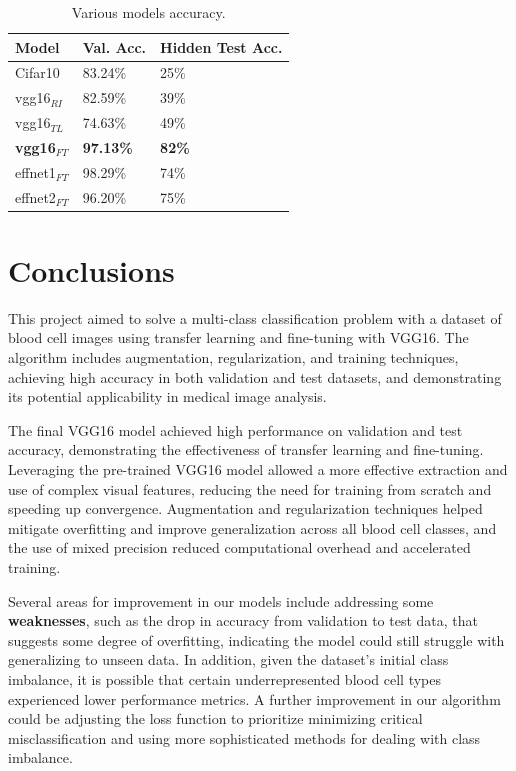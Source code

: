 \documentclass[11pt]{article}
\begin{document}
\begin{multicols*}{2}
        \begin{table}[H]
            \centering
            \setlength{\tabcolsep}{3pt}
            \caption{Various models accuracy.}
            \begin{tabularx}{\linewidth}{lYY}
                \toprule
                Model & Val. Acc. & Hidden Test Acc. \\
                \midrule
                Cifar10 & 83.24\% & 25\% \\
                vgg16$_{RI}$ & 82.59\% & 39\%\\
                vgg16$_{TL}$ & 74.63\% & 49\% \\
                \textbf{vgg16$_{FT}$} & \textbf{97.13\%} & \textbf{82\%} \\
                effnet1$_{FT}$ & 98.29\% & 74\% \\
                effnet2$_{FT}$ & 96.20\% & 75\% \\
                \bottomrule
            \end{tabularx}
            \label{tb:Measurements}
        \end{table}

        \section{Conclusions}

        This project aimed to solve a multi-class classification problem with a dataset of blood cell images using transfer learning and fine-tuning with VGG16. The algorithm includes augmentation, regularization, and training techniques, achieving high accuracy in both validation and test datasets, and demonstrating its potential applicability in medical image analysis.

        
        The final VGG16 model achieved high performance on validation and test accuracy, demonstrating the effectiveness of transfer learning and fine-tuning. Leveraging the pre-trained VGG16 model allowed a more effective extraction and use of complex visual features, reducing the need for training from scratch and speeding up convergence. Augmentation and regularization techniques helped mitigate overfitting and improve generalization across all blood cell classes, and the use of mixed precision reduced computational overhead and accelerated training. 
        
        Several areas for improvement in our models include addressing some \textbf{weaknesses}, such as the drop in accuracy from validation to test data, that suggests some degree of overfitting, indicating the model could still struggle with generalizing to unseen data. In addition, given the dataset's initial class imbalance, it is possible that certain underrepresented blood cell types experienced lower performance metrics. A further improvement in our algorithm could be adjusting the loss function to prioritize minimizing critical misclassification and using more sophisticated methods for dealing with class imbalance.


\end{multicols*}
\end{document}
